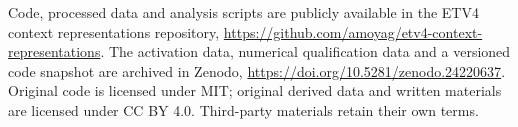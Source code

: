 \documentclass[a4paper,11pt]{scrartcl}
\begin{document}
Code, processed data and analysis scripts are publicly available in the ETV4 context representations repository, \url{https://github.com/amoyag/etv4-context-representations}. The activation data, numerical qualification data and a versioned code snapshot are archived in Zenodo, \url{https://doi.org/10.5281/zenodo.24220637}. Original code is licensed under MIT; original derived data and written materials are licensed under CC BY 4.0. Third-party materials retain their own terms.
\end{document}
